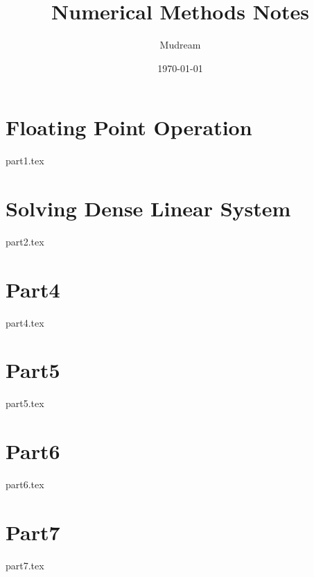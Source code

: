 \documentclass{article}
\title{Numerical Methods Notes}
\author{Mudream}
\date{\today}
\begin{document}
    \maketitle
    \part{Floating Point Operation}
    {part1.tex}
    \part{Solving Dense Linear System}
    {part2.tex}
    \part{Part4}
    {part4.tex}
    \part{Part5}
    {part5.tex}
    \part{Part6}
    {part6.tex}
    \part{Part7}
    {part7.tex}
\end{document}
